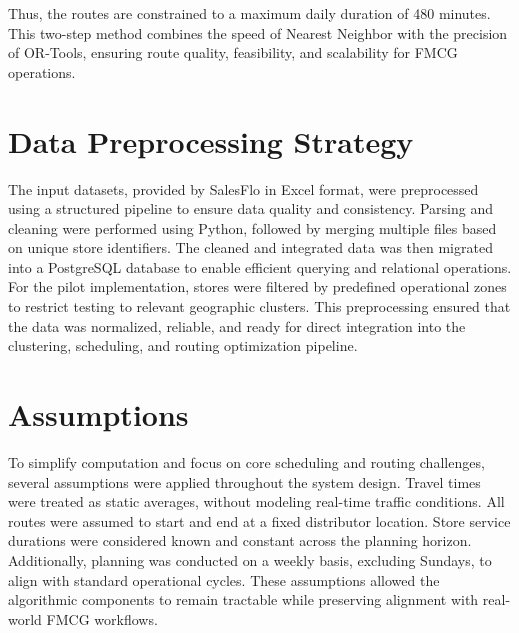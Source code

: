 Thus, the routes are constrained to a maximum daily duration of 480 minutes. This two-step method combines the speed of Nearest Neighbor with the precision of OR-Tools, ensuring route quality, feasibility, and scalability for FMCG operations.
\section{Data Preprocessing Strategy}



The input datasets, provided by SalesFlo in Excel format, were preprocessed using a structured pipeline to ensure data quality and consistency. Parsing and cleaning were performed using Python, followed by merging multiple files based on unique store identifiers. The cleaned and integrated data was then migrated into a PostgreSQL database to enable efficient querying and relational operations. For the pilot implementation, stores were filtered by predefined operational zones to restrict testing to relevant geographic clusters. This preprocessing ensured that the data was normalized, reliable, and ready for direct integration into the clustering, scheduling, and routing optimization pipeline.
\section{Assumptions}
To simplify computation and focus on core scheduling and routing challenges, several assumptions were applied throughout the system design. Travel times were treated as static averages, without modeling real-time traffic conditions. All routes were assumed to start and end at a fixed distributor location. Store service durations were considered known and constant across the planning horizon. Additionally, planning was conducted on a weekly basis, excluding Sundays, to align with standard operational cycles. These assumptions allowed the algorithmic components to remain tractable while preserving alignment with real-world FMCG workflows.

